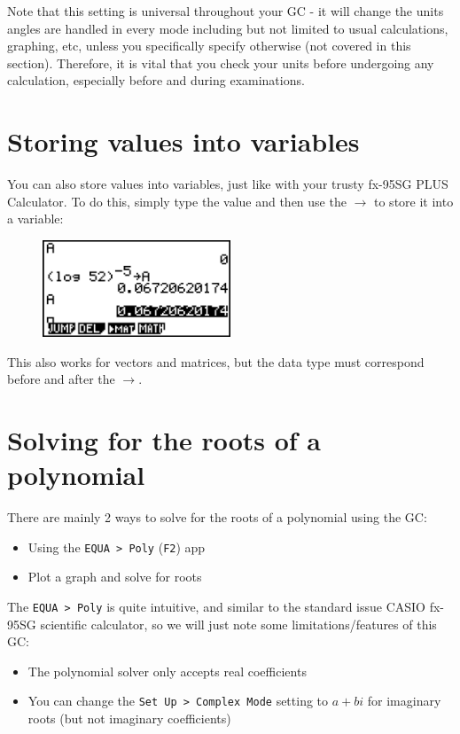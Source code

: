\documentclass[a5paper]{memoir}
\def\code#1{\texttt{#1}}
\def\Ftwo{(\code{F2}) }
\begin{document}
Note that this setting is universal throughout your GC - it will change the units angles are handled in every mode including but not limited to usual calculations, graphing, etc, unless you specifically specify otherwise (not covered in this section). Therefore, it is vital that you check your units before undergoing any calculation, especially before and during examinations.

\section{Storing values into variables}
You can also store values into variables, just like with your trusty fx-95SG PLUS Calculator. To do this, simply type the value and then use the $\rightarrow$ to store it into a variable:

\begin{figure}[h]
	\centering
	\includegraphics[width=0.5\textwidth]{savevar}
\end{figure}

This also works for vectors and matrices, but the data type must correspond before and after the $\rightarrow$.

\section{Solving for the roots of a polynomial}
There are mainly 2 ways to solve for the roots of a polynomial using the GC:
\begin{itemize}
	\item Using the \code{EQUA > Poly} \Ftwo app
	\item Plot a graph and solve for roots
\end{itemize}

The \code{EQUA > Poly} is quite intuitive, and similar to the standard issue CASIO fx-95SG scientific calculator, so we will just note some limitations/features of this GC:
\begin{itemize}
	\item The polynomial solver only accepts real coefficients
	\item You can change the \code{Set Up > Complex Mode} setting to \code{$a+bi$} for imaginary roots (but not imaginary coefficients)
\end{itemize}
\end{document}
